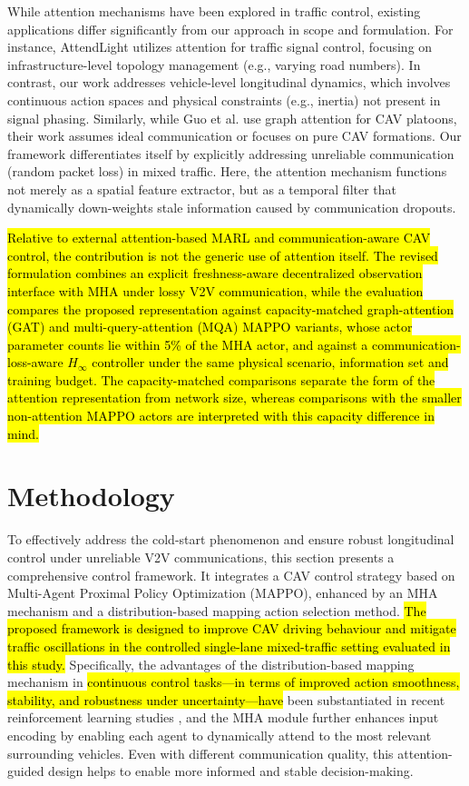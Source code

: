 \documentclass{ieeeaccess}
\begin{document}
 While attention mechanisms have been explored in traffic control, existing applications differ significantly from our approach in scope and formulation. For instance, AttendLight \cite{Oroojlooy2020_AttendLight} utilizes attention for traffic signal control, focusing on infrastructure-level topology management (e.g., varying road numbers). In contrast, our work addresses vehicle-level longitudinal dynamics, which involves continuous action spaces and physical constraints (e.g., inertia) not present in signal phasing. Similarly, while Guo et al. use graph attention for CAV platoons, their work assumes ideal communication or focuses on pure CAV formations\cite{guo2024attention}. Our framework differentiates itself by explicitly addressing unreliable communication (random packet loss) in mixed traffic. Here, the attention mechanism functions not merely as a spatial feature extractor, but as a temporal filter that dynamically down-weights stale information caused by communication dropouts.

\hl{Relative to external attention-based MARL and communication-aware CAV control, the contribution is not the generic use of attention itself. The revised formulation combines an explicit freshness-aware decentralized observation interface with MHA under lossy V2V communication, while the evaluation compares the proposed representation against capacity-matched graph-attention (GAT) and multi-query-attention (MQA) MAPPO variants, whose actor parameter counts lie within 5\% of the MHA actor, and against a communication-loss-aware $H_\infty$ controller under the same physical scenario, information set and training budget. The capacity-matched comparisons separate the form of the attention representation from network size, whereas comparisons with the smaller non-attention MAPPO actors are interpreted with this capacity difference in mind.}

\section{Methodology}
\label{sec:Methodology}
To effectively address the cold-start phenomenon and ensure robust longitudinal control under unreliable V2V communications, this section presents a comprehensive control framework.
It integrates a CAV control strategy based on Multi-Agent Proximal Policy Optimization (MAPPO), enhanced by an MHA mechanism and a distribution-based mapping action selection method. \hl{The proposed framework is designed to improve CAV driving behaviour and mitigate traffic oscillations in the controlled single-lane mixed-traffic setting evaluated in this study.} Specifically, the advantages of the distribution-based mapping mechanism in \hl{continuous control tasks---in terms of improved action smoothness, stability, and robustness under uncertainty---have} been substantiated in recent reinforcement learning studies \cite{shi2022deep}, and the MHA module further enhances input encoding by enabling each agent to dynamically attend to the most relevant surrounding vehicles. Even with different communication quality, this attention-guided design helps to enable more informed and stable decision-making.
\end{document}
